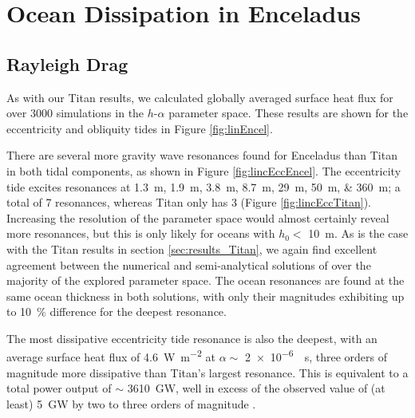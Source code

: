 \section{Ocean Dissipation in Enceladus \label{sec:results_Enceladus}}

\subsection{Rayleigh Drag} \label{sec:ray_enc}

As with our Titan results, we calculated globally averaged surface heat flux for over 3000 simulations in the $h$-$\alpha$ parameter space. These results are shown for the eccentricity and obliquity tides in Figure \ref{fig:linEncel}.

There are several more gravity wave resonances found for Enceladus than Titan in both tidal components, as shown in Figure \ref{fig:lincEccEncel}. The eccentricity tide excites resonances at \SIlist{1.3;1.9;3.8;8.7;29;50;360}{m}; a total of 7 resonances, whereas Titan only has 3 (Figure \ref{fig:lincEccTitan}). 
Increasing the resolution of the parameter space would almost certainly reveal more resonances, but this is only likely for oceans with $h_0 <$ \SI{10}{\metre}. As is the case with the Titan results in section \ref{sec:results_Titan}, we again find excellent agreement between the numerical and semi-analytical solutions of \citet{matsuyama2014tidal} over the majority of the explored parameter space. The ocean resonances are found at the same ocean thickness in both solutions, with only their magnitudes exhibiting up to \SI{10}{\percent} difference for the deepest resonance.

The most dissipative eccentricity tide resonance is also the deepest, with an average surface heat flux of \SI{4.6}{\watt\per\square\metre} at $\alpha\sim$ \SI{2e-6}{\per\second}, three orders of magnitude more dissipative than Titan's largest resonance. This is equivalent to a total power output of $\sim$ \SI{3610}{\giga\watt}, well in excess of the observed value of (at least) \SI{5}{\giga\watt} by two to three orders of magnitude \citep{spencer2006cassini,howett2011high, spencer2013new}.  

